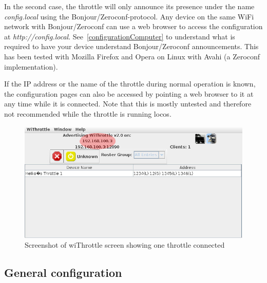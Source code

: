 \documentclass[11pt,a4paper]{scrartcl}
\begin{document}
In the second case, the throttle will only announce its presence under the name \textit{config.local} using the Bonjour/Zeroconf-protocol. Any device on the same WiFi network with Bonjour/Zeroconf can use a web browser to access the configuration at \textit{http://config.local}. See~\ref{configurationComputer} to understand what is required to have your device understand Bonjour/Zeroconf announcements. This has been tested with Mozilla Firefox and Opera on Linux with Avahi (a Zeroconf implementation).

If the IP address or the name of the throttle during normal operation is known, the configuration pages can also be accessed by pointing a web browser to it at any time while it is connected. Note that this is mostly untested and therefore not recommended while the throttle is running locos.

\begin{figure}[tbh]
  \centering
  \includegraphics[width=0.8 \textwidth]{images/withrottle_Screenshot}
  \caption{Screenshot of wiThrottle screen showing one throttle connected}
  \label{withrottleScreenshot}
\end{figure}

\subsection{General configuration} \label{throttle_GeneralConf}
\end{document}
